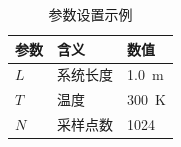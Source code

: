 \begin{table}[htbp]
  \centering
  \caption{参数设置示例}
  \label{tab:parameters}
  \begin{tabular}{lll}
    \toprule
    参数 & 含义 & 数值 \\
    \midrule
    $L$ & 系统长度 & \SI{1.0}{m} \\
    $T$ & 温度 & \SI{300}{K} \\
    $N$ & 采样点数 & 1024 \\
    \bottomrule
  \end{tabular}
\end{table}
